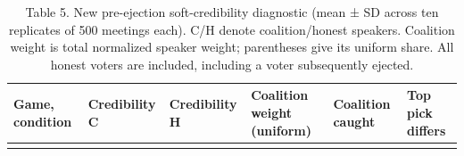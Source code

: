 \documentclass[
  12pt,
]{article}
\begin{document}
\begin{table}[htbp]
\centering
\caption{Table 5. New pre-ejection soft-credibility diagnostic (mean ± SD across
ten replicates of 500 meetings each). C/H denote coalition/honest
speakers. Coalition weight is total normalized speaker weight;
parentheses give its uniform share. All honest voters are included,
including a voter subsequently ejected.}\label{tab:5}
\begin{tabular}{@{}
  >{\raggedright\arraybackslash}p{}
  >{\raggedleft\arraybackslash}p{}
  >{\raggedleft\arraybackslash}p{}
  >{\raggedleft\arraybackslash}p{}
  >{\raggedleft\arraybackslash}p{}
  >{\raggedleft\arraybackslash}p{}@{}}
\toprule\noalign{}
\begin{minipage}[b]{\linewidth}\raggedright
Game, condition
\end{minipage} & \begin{minipage}[b]{\linewidth}\raggedleft
Credibility C
\end{minipage} & \begin{minipage}[b]{\linewidth}\raggedleft
Credibility H
\end{minipage} & \begin{minipage}[b]{\linewidth}\raggedleft
Coalition weight (uniform)
\end{minipage} & \begin{minipage}[b]{\linewidth}\raggedleft
Coalition caught
\end{minipage} & \begin{minipage}[b]{\linewidth}\raggedleft
Top pick differs
\end{minipage} \\
\midrule\noalign{}


\end{tabular}
\end{table}
\end{document}
